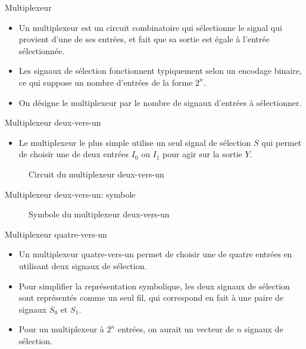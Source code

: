 \documentclass[presentation]{beamer}
\begin{document}
\begin{frame}[label={sec:orgcd3053a}]{Multiplexeur}
\begin{itemize}
\item Un multiplexeur est un circuit combinatoire qui sélectionne le signal qui provient d'une de ses entrées, et fait que sa sortie est égale à l'entrée sélectionnée.

\item Les signaux de sélection fonctionnent typiquement selon un encodage binaire, ce qui suppose un nombre d'entrées de la forme \(2^n\).

\item On désigne le multiplexeur par le nombre de signaux d'entrées à sélectionner.
\end{itemize}
\end{frame}

\begin{frame}[label={sec:orga2f04d6}]{Multiplexeur deux-vers-un}
\begin{itemize}
\item Le multiplexeur le plus simple utilise un seul signal de sélection \(S\) qui permet de choisir une de deux entrées \(I_0\) ou \(I_1\) pour agir sur la sortie \(Y\).
\end{itemize}

\begin{figure}[htbp]
\centering

\caption{\label{fig:orge2c73e5}Circuit du multiplexeur deux-vers-un}
\end{figure}
\end{frame}

\begin{frame}[label={sec:org652ed01}]{Multiplexeur deux-vers-un: symbole}
\begin{figure}[htbp]
\centering

\caption{\label{fig:org3634555}Symbole du multiplexeur deux-vers-un}
\end{figure}
\end{frame}

\begin{frame}[label={sec:org9c35613}]{Multiplexeur quatre-vers-un}
\begin{itemize}
\item Un multiplexeur quatre-vers-un permet de choisir une de quatre entrées en utilisant deux signaux de sélection.

\item Pour simplifier la représentation symbolique, les deux signaux de sélection sont représentés comme un seul fil, qui correspond en fait à une paire de signaux \(S_0\) et \(S_1\).

\item Pour un multiplexeur à \(2^n\) entrées, on aurait un vecteur de \(n\) signaux de sélection.
\end{itemize}
\end{frame}
\end{document}
